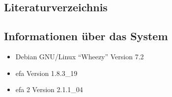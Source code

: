 \documentclass[a4paper,12pt,twoside]{article}
\begin{document}
\subsection{Literaturverzeichnis}
\label{sct:literatur}




\subsection{Informationen über das System}
\label{sct:sysinfo}

\begin{itemize}
    \item Debian GNU/Linux "`Wheezy"' Version 7.2
    \item efa Version 1.8.3\_19
    \item efa 2 Version 2.1.1\_04
\end{itemize}
\end{document}
